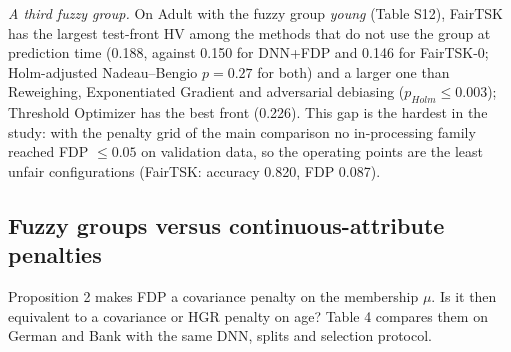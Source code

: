 \documentclass[pdflatex,sn-basic,Numbered,lineno]{sn-jnl}
\begin{document}
\emph{A third fuzzy group.} On Adult with the fuzzy group \emph{young} (Table S12), FairTSK has the largest test-front HV among the methods that do not use the group at prediction time (0.188, against 0.150 for DNN+FDP and 0.146 for FairTSK-0; Holm-adjusted Nadeau--Bengio \(p = 0.27\) for both) and a larger one than Reweighing, Exponentiated Gradient and adversarial debiasing (\(p_{Holm} \leq 0.003\)); Threshold Optimizer has the best front (0.226). This gap is the hardest in the study: with the penalty grid of the main comparison no in-processing family reached FDP \(\leq 0.05\) on validation data, so the operating points are the least unfair configurations (FairTSK: accuracy 0.820, FDP 0.087).

\hypertarget{fuzzy-groups-versus-continuous-attribute-penalties}{%
\subsection{Fuzzy groups versus continuous-attribute penalties}\label{fuzzy-groups-versus-continuous-attribute-penalties}}

Proposition 2 makes FDP a covariance penalty on the membership \(\mu\). Is it then equivalent to a covariance or HGR penalty on age? Table 4 compares them on German and Bank with the same DNN, splits and selection protocol.
\end{document}
